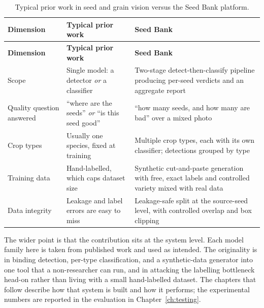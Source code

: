 \begin{singlespace}
\begin{longtable}{p{} p{} p{}}
\caption{Typical prior work in seed and grain vision versus the Seed Bank platform.}
\label{tab:ch2-compare} \\
\toprule
\textbf{Dimension} & \textbf{Typical prior work} & \textbf{Seed Bank} \\
\midrule
\endfirsthead
\toprule
\textbf{Dimension} & \textbf{Typical prior work} & \textbf{Seed Bank} \\
\midrule
\endhead
\bottomrule
\endfoot
Scope &
Single model: a detector \emph{or} a classifier &
Two-stage detect-then-classify pipeline producing per-seed verdicts and an aggregate report \\
Quality question answered &
``where are the seeds'' \emph{or} ``is this seed good'' &
``how many seeds, and how many are bad'' over a mixed photo \\
Crop types &
Usually one species, fixed at training &
Multiple crop types, each with its own classifier; detections grouped by type \\
Training data &
Hand-labelled, which caps dataset size &
Synthetic cut-and-paste generation with free, exact labels and controlled variety mixed with real data \\
Data integrity &
Leakage and label errors are easy to miss &
Leakage-safe split at the source-seed level, with controlled overlap and box clipping \\
\end{longtable}
\end{singlespace}

The wider point is that the contribution sits at the system level. Each model
family here is taken from published work and used as intended. The originality is
in binding detection, per-type classification, and a synthetic-data generator
into one tool that a non-researcher can run, and in attacking the labelling
bottleneck head-on rather than living with a small hand-labelled dataset. The
chapters that follow describe how that system is built and how it performs; the
experimental numbers are reported in the evaluation in Chapter~\ref{ch:testing}.
